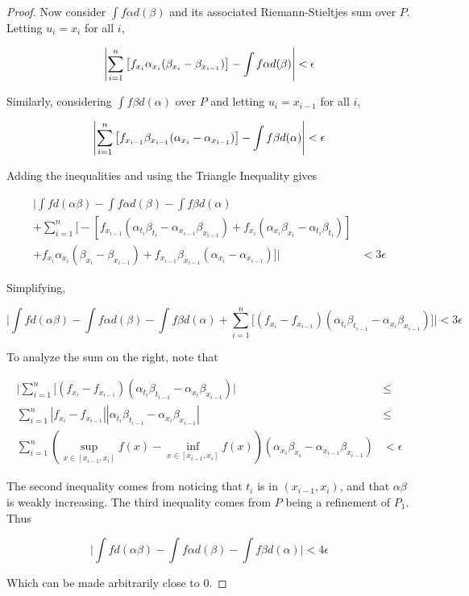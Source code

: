 \documentclass{amsart}
\DeclarePairedDelimiter{\abs}{\lvert}{\rvert}
\begin{document}
\begin{proof}
Now consider $\int f\alpha d(\beta)$ and its associated Riemann-Stieltjes sum over $P$. Letting $u_i = x_i$ for all $i$,

\[
\abs*{ \sum_{i=1}^n \left[f_{x_i}\alpha_{x_i}(\beta_{x_i} - \beta_{x_{i-1}})\right]
- \int f\alpha d(\beta)}
< \epsilon
\]

Similarly, considering $\int f\beta d(\alpha)$ over $P$ and letting $u_i = x_{i-1}$ for all $i$,

\[
\abs*{ \sum_{i=1}^n \left[f_{x_{i-1}}\beta_{x_{i-1}}(\alpha_{x_i} - \alpha_{x_{i-1}})\right]
- \int f\beta d(\alpha)}
< \epsilon
\]

Adding the inequalities and using the Triangle Inequality gives

\begin{align*}
\bigg|
\int f d(\alpha\beta) - \int f\alpha d(\beta) - \int f\beta d(\alpha) & \\
+ \sum_{i=1}^n \Big[
-\left[f_{x_{i-1}}(\alpha_{t_i}\beta_{t_i} - \alpha_{x_{i-1}}\beta_{x_{i-1}})
+ f_{x_i}(\alpha_{x_i}\beta_{x_i} - \alpha_{t_i}\beta_{t_i}) \right] & \\
+ f_{x_i}\alpha_{x_i}(\beta_{x_i} - \beta_{x_{i-1}})
+ f_{x_{i-1}}\beta_{x_{i-1}}(\alpha_{x_i} - \alpha_{x_{i-1}})
\Big] \bigg| &
< 3\epsilon
\end{align*}

Simplifying,

\[
\bigg|
\int f d(\alpha\beta) - \int f\alpha d(\beta) - \int f\beta d(\alpha) +
\sum_{i=1}^n \Big[
(f_{x_i} - f_{x_{i-1}}) (\alpha_{t_i}\beta_{t_{i-1}} - \alpha_{x_i}\beta_{x_{i-1}})
\Big] \bigg|
< 3\epsilon
\]

To analyze the sum on the right, note that

\begin{align*}
\bigg|
\sum_{i=1}^n \Big[(f_{x_i} - f_{x_{i-1}}) (\alpha_{t_i}\beta_{t_{i-1}} - \alpha_{x_i}\beta_{x_{i-1}})
\bigg| & \leq \\
\sum_{i=1}^n \left|f_{x_i} - f_{x_{i-1}}\right| \left|\alpha_{t_i}\beta_{t_{i-1}} - \alpha_{x_i}\beta_{x_{i-1}}\right| & \leq \\
\sum_{i=1}^n \left(\sup_{x \in [x_{i-1}, x_i]} f(x) - \inf_{x \in [x_{i-1}, x_i]} f(x)\right)
\left(\alpha_{x_i}\beta_{x_i} - \alpha_{x_{i-1}}\beta_{x_{i-1}}\right) & < \epsilon
\end{align*}

The second inequality comes from noticing that $t_i$ is in $(x_{i-1}, x_i)$, and that $\alpha\beta$ is weakly increasing. The third inequality comes from $P$ being a refinement of $P_1$. Thus

\[
\bigg| \int f d(\alpha\beta) - \int f\alpha d(\beta) - \int f\beta d(\alpha) \bigg|
< 4\epsilon
\]

Which can be made arbitrarily close to 0.

\end{proof}
\end{document}
